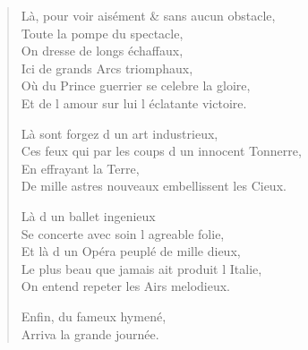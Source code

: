\begin{verse}
Là, pour voir aisément \& sans aucun obstacle, \\
\vin Toute la pompe du spectacle, \\
\vin On dresse de longs échaffaux, \\
\vin Ici de grands Arcs triomphaux, \\
Où du Prince guerrier se celebre la gloire, \\
Et de l\textquotesingle{} amour sur lui l\textquotesingle{} éclatante victoire.

\vin Là sont forgez d\textquotesingle{} un art industrieux, \\
Ces feux qui par les coups d\textquotesingle{} un innocent Tonnerre, \\
\vin En effrayant la Terre, \\
De mille astres nouveaux embellissent les Cieux.

\vin Là d\textquotesingle{} un ballet ingenieux \\
Se concerte avec soin l\textquotesingle{} agreable folie, \\
Et là d\textquotesingle{} un Opéra peuplé de mille dieux, \\
Le plus beau que jamais ait produit l\textquotesingle{} Italie, \\
On entend repeter les Airs melodieux.

\vin Enfin, du fameux hymené, \\
\vin Arriva la grande journée.


\end{verse}
